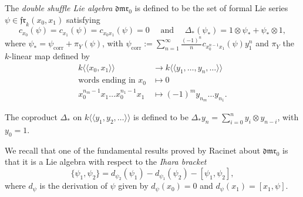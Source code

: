 \documentclass[a4paper,fleqn]{cas-sc}
\newtheorem{theorem}{Theorem}
\begin{document}
\begin{definition} \label{def:double-shuffle}
The \textit{double shuffle Lie algebra} $\mathfrak{dmr}_0$ is defined to be the set of formal Lie series $\psi\in \mathfrak{fr}_k(x_0,x_1)$ satisfying  
\begin{equation*} \label{eq:def-dmr0}
	c_{x_0}(\psi)=c_{x_1}(\psi)=c_{x_0x_1}(\psi)=0 \quad \text{ and } \quad \Delta_{*}(\psi_{*})=1\otimes \psi_{*}+\psi_{*}\otimes 1,
\end{equation*}
where $\psi_{*}=\psi_{\text{corr}}+\pi_{Y}(\psi)$, with $\psi_{\text{corr}}:=\sum_{n=1}^{\infty}\frac{(-1)^n}{n}c_{x^{n-1}_0x_1}(\psi)y^n_1$ and
$\pi_Y$ the $k$-linear map defined by
\begin{equation*}
    \begin{split}
        k\langle\langle x_0,x_1\rangle\rangle & \to k\langle\langle y_1,\dots,y_n,\dots\rangle\rangle \\
        \text{words ending in } x_0 & \mapsto 0\\
        x^{n_m-1}_0x_1\dots x^{n_1-1}_0x_1 & \mapsto (-1)^m y_{n_m}\dots y_{n_1}.
    \end{split}
\end{equation*}


The coproduct $\Delta_{*}$ on $k\langle\langle y_1,y_2,\dots \rangle\rangle$ is defined to be $\Delta_{*}y_n=\sum_{i=0}^n y_i\otimes y_{n-i}$, with $y_0=1$.
\end{definition}

We recall that one of the fundamental results proved by Racinet \cite{Racinet2002} about $\mathfrak{dmr}_0$ is that it is a Lie algebra with respect to the \textit{Ihara bracket}
	\begin{equation}\label{eq:Ihara_bracket}
		\{\psi_1,\psi_2\}=d_{\psi_2}(\psi_1)-d_{\psi_1}(\psi_2)-[\psi_1,\psi_2],
	\end{equation}
	where $d_{\psi}$ is the derivation of $\psi$ %
    given by $d_{\psi}(x_0)=0$ and $d_{\psi}(x_1)=[x_1,\psi]$. \\
\end{document}
